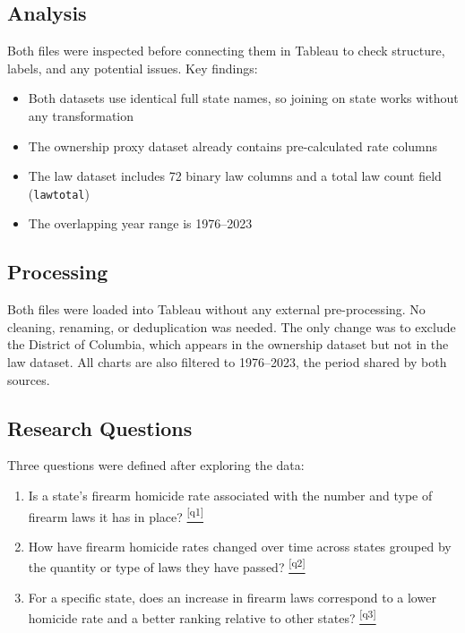 \documentclass[a4paper,11pt]{article}
\newcommand*{\sref}[1]{%
  \hyperref[{#1}]{%
    \color{accent}\textsuperscript{\ref*{#1}}%
  }%
}
\begin{document}
\subsection{Analysis}

\par
Both files were inspected before connecting them in Tableau to check structure,
labels, and any potential issues. Key findings:

\begin{itemize}
	\item Both datasets use identical full state names, so joining on state works without any transformation
	\item The ownership proxy dataset already contains pre-calculated rate columns
	\item The law dataset includes 72 binary law columns and a total law count field (\texttt{lawtotal})
	\item The overlapping year range is 1976--2023
\end{itemize}

\subsection{Processing}

\par
Both files were loaded into Tableau without any external pre-processing. No
cleaning, renaming, or deduplication was needed. The only change was to exclude
the District of Columbia, which appears in the ownership dataset but not in the
law dataset. All charts are also filtered to 1976--2023, the period shared by
both sources.

\subsection{Research Questions}

\par
Three questions were defined after exploring the data:

\begin{enumerate}
	\item Is a state's firearm homicide rate associated with the number
	      and type of firearm laws it has in place?\sref{q1}
	\item How have firearm homicide rates changed over time across states
	      grouped by the quantity or type of laws they have passed?\sref{q2}
	\item For a specific state, does an increase in firearm laws correspond
	      to a lower homicide rate and a better ranking relative to other states?\sref{q3}
\end{enumerate}
\end{document}
